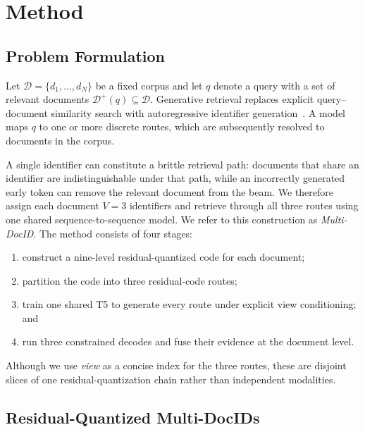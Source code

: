 
\section{Method}
\label{sec:method}

\subsection{Problem Formulation}
\label{sec:problem}

Let $\mathcal{D}=\{d_1,\ldots,d_N\}$ be a fixed corpus and let $q$ denote a query with a set of relevant documents $\mathcal{D}^{+}(q)\subseteq\mathcal{D}$. Generative retrieval replaces explicit query--document similarity search with autoregressive identifier generation~\citep{tay2022dsi}. A model maps $q$ to one or more discrete routes, which are subsequently resolved to documents in the corpus.

A single identifier can constitute a brittle retrieval path: documents that share an identifier are indistinguishable under that path, while an incorrectly generated early token can remove the relevant document from the beam. We therefore assign each document $V=3$ identifiers and retrieve through all three routes using one shared sequence-to-sequence model. We refer to this construction as \emph{Multi-DocID}. The method consists of four stages:
\begin{enumerate}[leftmargin=*,nosep]
    \item construct a nine-level residual-quantized code for each document;
    \item partition the code into three residual-code routes;
    \item train one shared T5 to generate every route under explicit view conditioning; and
    \item run three constrained decodes and fuse their evidence at the document level.
\end{enumerate}
Although we use \emph{view} as a concise index for the three routes, these are disjoint slices of one residual-quantization chain rather than independent modalities.

\subsection{Residual-Quantized Multi-DocIDs}
\label{sec:rq-multidocid}

